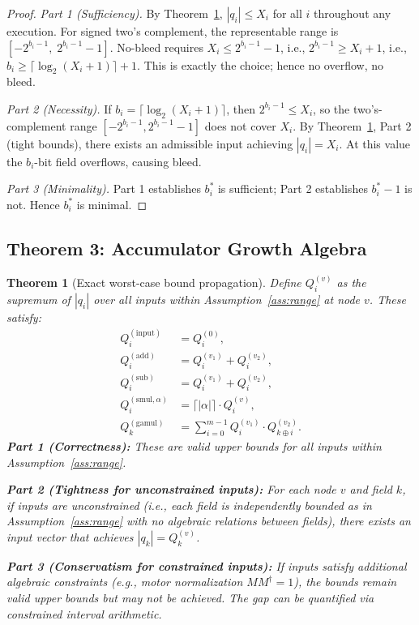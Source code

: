 \documentclass[11pt,a4paper]{article}
\theoremstyle{definition}
\theoremstyle{plain}
\newtheorem{theorem}{Theorem}[section]
\theoremstyle{remark}
\begin{document}
\begin{proof}
\textit{Part 1 (Sufficiency).}
By Theorem~\ref{thm:growth}, $|q_i| \le X_i$ for all $i$ throughout
any execution.
For signed two's complement, the representable range is
$[-2^{b_i-1},\; 2^{b_i-1}-1]$.
No-bleed requires $X_i \le 2^{b_i-1}-1$, i.e.,
$2^{b_i-1} \ge X_i + 1$, i.e.,
$b_i \ge \lceil\log_2(X_i+1)\rceil + 1$.
This is exactly the choice; hence no overflow, no bleed.

\textit{Part 2 (Necessity).}
If $b_i = \lceil\log_2(X_i+1)\rceil$, then
$2^{b_i-1} \le X_i$, so the two's-complement range
$[-2^{b_i-1}, 2^{b_i-1}-1]$ does not cover $X_i$.
By Theorem~\ref{thm:growth}, Part 2 (tight bounds), there exists
an admissible input achieving $|q_i| = X_i$.
At this value the $b_i$-bit field overflows, causing bleed.

\textit{Part 3 (Minimality).}
Part 1 establishes $b_i^*$ is sufficient; Part 2 establishes
$b_i^* - 1$ is not.
Hence $b_i^*$ is minimal.
\end{proof}

\subsection{Theorem 3: Accumulator Growth Algebra}
\label{sec:growth}

\begin{theorem}[Exact worst-case bound propagation]
\label{thm:growth}
Define $Q_i^{(v)}$ as the supremum of $|q_i|$ over all inputs within
Assumption~\ref{ass:range} at node $v$.
These satisfy:
\begin{align}
  Q_i^{(\mathrm{input})} &= Q_i^{(0)},
    \label{eq:rec-input}\\
  Q_i^{(\mathrm{add})} &= Q_i^{(v_1)} + Q_i^{(v_2)},
    \label{eq:rec-add}\\
  Q_i^{(\mathrm{sub})} &= Q_i^{(v_1)} + Q_i^{(v_2)},
    \label{eq:rec-sub}\\
  Q_i^{(\mathrm{smul},\alpha)} &= \lceil |\alpha| \rceil \cdot Q_i^{(v)},
    \label{eq:rec-smul}\\
  Q_k^{(\mathrm{gamul})} &= \sum_{i=0}^{m-1}
    Q_i^{(v_1)} \cdot Q_{k\oplus i}^{(v_2)}.
    \label{eq:rec-gamul}
\end{align}
\textbf{Part 1 (Correctness):} These are valid upper bounds for all
inputs within Assumption~\ref{ass:range}.

\textbf{Part 2 (Tightness for unconstrained inputs):}
For each node $v$ and field $k$, if inputs are unconstrained
(i.e., each field is independently bounded as in
Assumption~\ref{ass:range} with no algebraic relations between fields),
there exists an input vector that achieves $|q_k| = Q_k^{(v)}$.

\textbf{Part 3 (Conservatism for constrained inputs):}
If inputs satisfy additional algebraic constraints (e.g., motor
normalization $MM^\dagger = 1$), the bounds remain valid upper bounds
but may not be achieved.
The gap can be quantified via constrained interval arithmetic.
\end{theorem}
\end{document}
